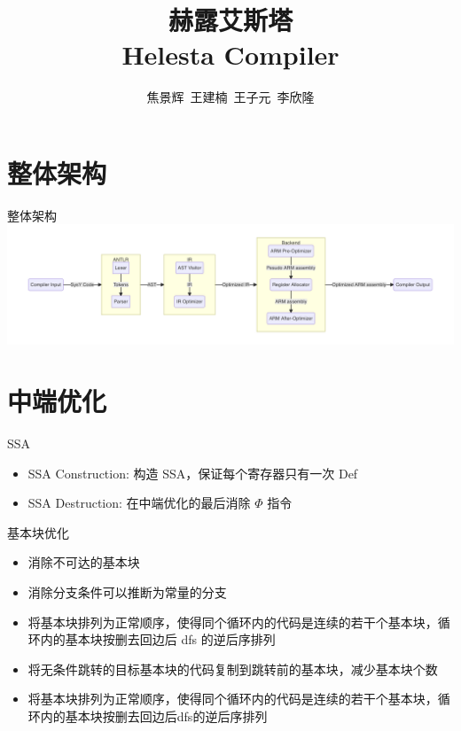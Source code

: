 \documentclass[aspectratio=169,UTF-8]{ctexbeamer}
\title{赫露艾斯塔\\ Helesta Compiler}
\author{焦景辉\ 王建楠\ 王子元\ 李欣隆}
\institute{清华大学}
\begin{document}
	\maketitle
	
	\begin{frame}
		\tableofcontents
	\end{frame}
	
	\section{整体架构}
	
		\begin{frame}{整体架构}
			\includegraphics[width=\textwidth]{arch.png}
		\end{frame}
			
	\section{中端优化}
	
		\begin{frame}{SSA}
			\begin{itemize}
				\item SSA Construction: 构造 SSA，保证每个寄存器只有一次 Def
				\item SSA Destruction: 在中端优化的最后消除 $\Phi$ 指令
			\end{itemize}
		\end{frame}
		
		\begin{frame}{基本块优化}
			\begin{itemize}
				\item 消除不可达的基本块
				\item 消除分支条件可以推断为常量的分支
				\item 将基本块排列为正常顺序，使得同个循环内的代码是连续的若干个基本块，循环内的基本块按删去回边后 dfs 的逆后序排列
				\item 将无条件跳转的目标基本块的代码复制到跳转前的基本块，减少基本块个数
				\item 将基本块排列为正常顺序，使得同个循环内的代码是连续的若干个基本块，循环内的基本块按删去回边后dfs的逆后序排列
			\end{itemize}
		\end{frame}
		
\end{document}
